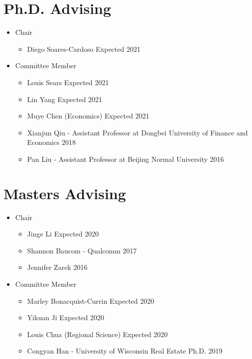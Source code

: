 \documentclass{res} %
\begin{document}
\begin{resume}
\section{Ph.D. Advising}
\begin{itemize}
	\item[] Chair
	\vspace{-0.05in}
	\begin{itemize} \itemsep -1pt
		\item[] Diego Soares-Cardoso \hfill Expected 2021
	\end{itemize}
	\vspace{-0.05in}
	\item[] Committee Member
	\vspace{-0.05in}
	\begin{itemize} \itemsep -1pt
		\item[] Louis Sears \hfill Expected 2021
		\item[] Lin Yang \hfill Expected 2021
		\item[] Muye Chen (Economics) \hfill Expected 2021
		\item[] Xianjun Qiu - Assistant Professor at Dongbei University of Finance and Economics \hfill 2018
		\item[] Pan Liu - Assistant Professor at Beijing Normal University \hfill 2016
	\end{itemize}
\end{itemize}
\vspace{-.075in}

\section{Masters Advising}
\begin{itemize}
	\item[] Chair
	\vspace{-0.05in}
	\begin{itemize} \itemsep -1pt
		\item[] Jinge Li \hfill Expected 2020
		\item[] Shannon Baucom - Qualcomm \hfill 2017
		\item[] Jennifer Zarek \hfill 2016
	\end{itemize}
	\vspace{-0.05in}
	\item[] Committee Member
	\vspace{-0.05in}
	\begin{itemize} \itemsep -1pt
		\item[] Marley Bonacquist-Currin \hfill Expected 2020
		\item[] Yikuan Ji \hfill Expected 2020
		\item[] Louis Chua (Regional Science) \hfill Expected 2020
		\item[] Congyan Han - University of Wisconsin Real Estate Ph.D. \hfill 2019
	\end{itemize}
\end{itemize}
\vspace{-.075in}


\end{resume}
\end{document}
